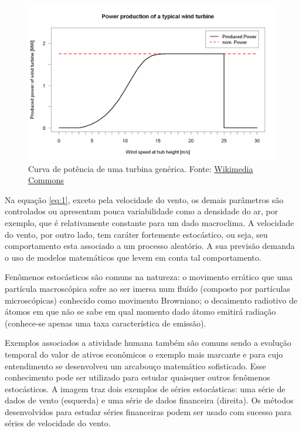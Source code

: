 \documentclass[
	12pt,				%
	openright,			%
	oneside,			%
	a4paper,			%
	english,			%
	french,				%
	spanish,			%
	brazil				%
	]{abntex2}
\begin{document}
\begin{figure}[h]
    \centering
	\includegraphics[width=\textwidth]{powercurve}
	\caption{Curva de potência de uma turbina genérica. Fonte: \href{https://upload.wikimedia.org/wikipedia/commons/6/67/Powercurve.png}{Wikimedia Commons}}
\end{figure}
\FloatBarrier

Na equação \ref{eq:1}, exceto pela velocidade do vento, os demais parâmetros são controlados ou apresentam pouca variabilidade como a densidade do ar, por exemplo, que é relativamente constante para um dado macroclima. A velocidade do vento, por outro lado, tem caráter fortemente estocástico, ou seja, seu comportamento esta associado a um processo aleatório. A sua previsão demanda o uso de modelos matemáticos que levem em conta tal comportamento.

Fenômenos estocásticos são comuns na natureza: o movimento errático que uma partícula macroscópica sofre ao ser 
imersa num fluído (composto por partículas microscópicas) conhecido como movimento Browniano; o decaimento radiotivo de átomos em que não se sabe em qual momento dado átomo emitirá radiação (conhece-se apenas uma taxa característica de emissão). 

Exemplos associados a atividade humana também são comuns sendo a evolução temporal do valor de ativos econômicos o exemplo mais marcante e para cujo entendimento se desenvolveu um arcabouço matemático sofisticado. Esse conhecimento pode ser utilizado para estudar quaisquer outros fenômenos estocásticos. A imagem traz dois exemplos de séries estocásticas: uma série de dados de vento (esquerda) e uma série de dados financeira (direita). Os métodos desenvolvidos para estudar séries financeiras podem ser usado com sucesso para séries de velocidade do vento.
\end{document}
